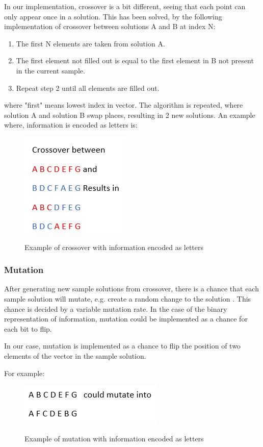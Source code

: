 In our implementation, crossover is a bit different, seeing that each point can only appear once in a solution. This has been solved, by the following implementation of crossover between solutions A and B at index N:
\begin{enumerate}
	\item The first N elements are taken from solution A.
	\item The first element not filled out is equal to the first element in B not present in the current sample.
	\item Repeat step 2 until all elements are filled out.
\end{enumerate}

where "first" means lowest index in vector. The algorithm is repeated, where solution A and solution B swap places, resulting in 2 new solutions. An example where, information is encoded as letters is:

\begin{figure}[h]
	\centering
	{\includegraphics[scale=0.5]{Images/crossover_letters.PNG}}\\[0.5cm]
	\caption{Example of crossover with information encoded as letters}
	\label{fig:crossover_letters}
\end{figure}

\FloatBarrier

\subsubsection{Mutation}
After generating new sample solutions from crossover, there is a chance that each sample solution will mutate, e.g. create a random change to the solution . This chance is decided by a variable mutation rate. In the case of the binary representation of information, mutation could be implemented as a chance for each bit to flip.

In our case, mutation is implemented as a chance to flip the position of two elements of the vector in the sample solution. 

For example:
\begin{figure}[h]
	\centering
	{\includegraphics[scale=0.5]{Images/mutation_letters.PNG}}\\[0.5cm]
	\caption{Example of mutation with information encoded as letters}
	\label{fig:mutation_letters}
\end{figure}